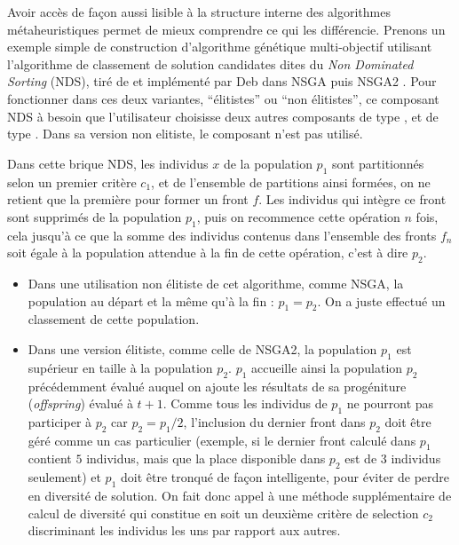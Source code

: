 Avoir accès de façon aussi lisible à la structure interne des algorithmes métaheuristiques permet de mieux comprendre ce qui les différencie. Prenons un exemple simple de construction d'algorithme génétique multi-objectif utilisant l'algorithme de classement de solution candidates dites du \textit{Non Dominated Sorting} (NDS), tiré de \autocite{Goldberg1989} et implémenté par Deb dans NSGA \autocite{Srinivas1994} puis NSGA2 \autocite{Deb2001}. Pour fonctionner dans ces deux variantes, \enquote{élitistes} ou \enquote{non élitistes}, ce composant NDS à besoin que l'utilisateur choisisse deux autres composants de type , et de type . Dans sa version non elitiste, le composant  n'est pas utilisé.

Dans cette brique NDS, les individus $x$ de la population $p_1$ sont partitionnés selon un premier critère $c_1$, et de l'ensemble de partitions ainsi formées, on ne retient que la première pour former un front $f$. Les individus qui intègre ce front sont supprimés de la population $p_1$, puis on recommence cette opération $n$ fois, cela jusqu'à ce que la somme des individus contenus dans l'ensemble des fronts $f_n$ soit égale à la population attendue à la fin de cette opération, c'est à dire $p_2$.

\begin{itemize}
\item Dans une utilisation non élitiste de cet algorithme, comme NSGA, la population au départ et la même qu'à la fin : $p_1 = p_2$. On a juste effectué un classement de cette population.
\item Dans une version élitiste, comme celle de NSGA2, la population $p_1$ est supérieur en taille à la population $p_2$. $p_1$ accueille ainsi la population $p_2$ précédemment évalué auquel on ajoute les résultats de sa progéniture (\textit{offspring}) évalué à $t + 1$. Comme tous les individus de $p_1$ ne pourront pas participer à $p_2$ car $p_2 = p_1 / 2$, l'inclusion du dernier front dans $p_2$ doit être géré comme un cas particulier (exemple, si le dernier front calculé dans $p_1$ contient $5$ individus, mais que la place disponible dans $p_2$ est de $3$ individus seulement) et $p_1$ doit être tronqué de façon intelligente, pour éviter de perdre en diversité de solution. On fait donc appel à une méthode supplémentaire de calcul de diversité qui constitue en soit un deuxième critère de selection $c_2$ discriminant les individus les uns par rapport aux autres.
\end{itemize}

